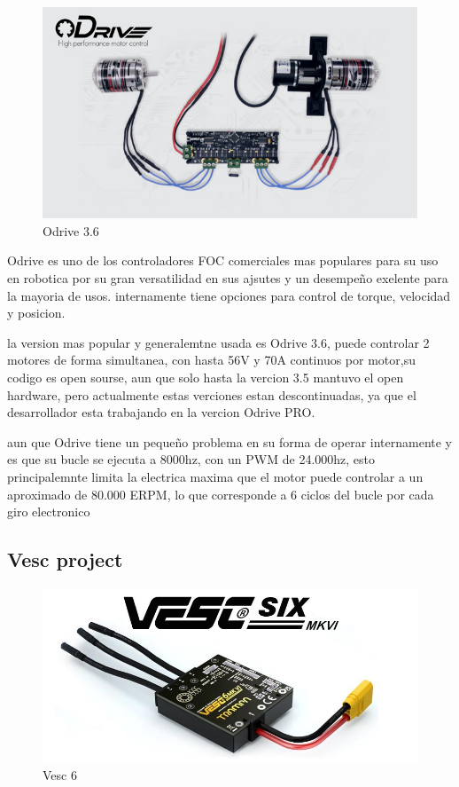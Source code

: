 \documentclass[11pt]{report}
\begin{document}
\begin{figure}[ht]
	\centering
	\includegraphics[scale=0.5]{imagenes/odrive_img.jpg}
	\caption{Odrive 3.6}
\end{figure}
\FloatBarrier

Odrive es uno de los controladores FOC comerciales mas populares para su uso en robotica por su gran versatilidad en sus ajsutes y un desempeño exelente para la mayoria de usos. internamente tiene opciones para control de torque, velocidad y posicion.

la version mas popular y generalemtne usada es Odrive 3.6, puede controlar 2 motores de forma simultanea, con hasta 56V y 70A continuos por motor,su codigo es open sourse, aun que solo hasta la vercion 3.5 mantuvo el open hardware, pero actualmente estas verciones estan descontinuadas, ya que el desarrollador esta trabajando en la vercion Odrive PRO.

aun que Odrive tiene un pequeño problema en su forma de operar internamente y es que su bucle se ejecuta a 8000hz, con un PWM de 24.000hz, esto principalemnte limita la electrica maxima que el motor puede controlar a un aproximado de 80.000 ERPM, lo que corresponde a 6 ciclos del bucle por cada giro electronico

\subsection{Vesc project}
\begin{figure}[ht]
	\centering
	\includegraphics[scale=0.5]{imagenes/Vesc.jpg}
	\caption{Vesc 6}
\end{figure}
\FloatBarrier
\end{document}
